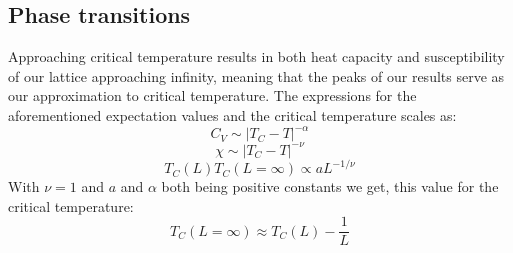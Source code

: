 \documentclass{emulateapj}
\begin{document}
\subsection{Phase transitions}
%
Approaching critical temperature results in both heat capacity and susceptibility of our lattice approaching infinity, meaning that the peaks of our results serve as our approximation to critical temperature. The expressions for the aforementioned expectation values and the critical temperature scales as:
%
\begin{equation*}
    C_{V} \sim |T_{C}-T|^{-\alpha}
\end{equation*}
%
\begin{equation*}
    \chi \sim |T_{C}-T|^{-\nu}
\end{equation*}
%
\begin{equation*}
    T_{C}(L) T_{C}(L=\infty) \propto a L^{- 1 / \nu}
\end{equation*}
%
With $\nu = 1$ and $a$ and $\alpha$ both being positive constants we get, this value for the critical temperature:
%
\begin{equation*}
    T_{C}(L=\infty) \approx T_{C}(L) -\frac{1}{L}
\end{equation*}
%
\end{document}
